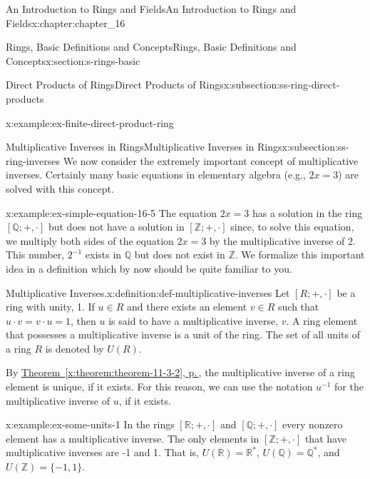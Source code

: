 \documentclass[twoside,10pt,]{book}
\newcommand{\xreffont}{\relax}
\numberwithin{equation}{section}
\begin{document}
\begin{chapterptx}{An Introduction to Rings and Fields}{}{An Introduction to Rings and Fields}{}{}{x:chapter:chapter_16}
\begin{sectionptx}{Rings, Basic Definitions and Concepts}{}{Rings, Basic Definitions and Concepts}{}{}{x:section:s-rings-basic}
\begin{subsectionptx}{Direct Products of Rings}{}{Direct Products of Rings}{}{}{x:subsection:ss-ring-direct-products}
\begin{example}{}{x:example:ex-finite-direct-product-ring}
\end{example}
\end{subsectionptx}
%
%
\typeout{************************************************}
\typeout{************************************************}
%
\begin{subsectionptx}{Multiplicative Inverses in Rings}{}{Multiplicative Inverses in Rings}{}{}{x:subsection:ss-ring-inverses}
We now consider the extremely important concept of multiplicative inverses. Certainly many basic equations in elementary algebra (e.g., \(2x = 3\)) are solved with this concept.%
\begin{example}{}{x:example:ex-simple-equation-16-5}%
The equation \(2x = 3\) has a solution in the ring \([\mathbb{Q}; +, \cdot ]\) but does not have a solution in \([\mathbb{Z}; +, \cdot ]\) since, to solve this equation, we  multiply both sides of the equation \(2x = 3\) by the multiplicative inverse of 2. This number, \(2^{-1}\) exists in \(\mathbb{Q}\) but does not exist in \(\mathbb{Z}\). We formalize this important idea in a definition which by now should be quite familiar to you.%
\end{example}
\begin{definition}{Multiplicative Inverses.}{x:definition:def-multiplicative-inverses}%
%
%
\label{g:notation:idm404591603952}%
Let \([R; +, \cdot ]\) be a ring with unity, 1.  If \(u \in R\) and there exists an element \(v \in  R\) such that \(u\cdot v = v\cdot u = 1\), then \(u\) is said to have a multiplicative inverse, \(v\). A ring element that possesses a multiplicative inverse is a unit of the ring. The set of all units of a ring \(R\) is denoted by \(U(R)\).%
\end{definition}
By \hyperref[x:theorem:theorem-11-3-2]{Theorem~{\xreffont\ref{x:theorem:theorem-11-3-2}}, p.\,\pageref{x:theorem:theorem-11-3-2}}, the multiplicative inverse of a ring element is unique, if it exists.   For this reason, we can use the notation \(u^{-1}\) for the multiplicative inverse of \(u\), if it exists.%
\begin{example}{}{x:example:ex-some-units-1}%
In the rings \([\mathbb{R}; +, \cdot]\) and \([\mathbb{Q}; +, \cdot]\) every nonzero element has a multiplicative inverse. The only elements in \([\mathbb{Z}; +, \cdot]\) that have multiplicative inverses are -1 and 1. That is, \(U(\mathbb{R}) = \mathbb{R}^*\), \(U(\mathbb{Q}) = \mathbb{Q}^*\), and \(U(\mathbb{Z}) = \{-1, 1\}\).%
\end{example}

\end{subsectionptx}
\end{sectionptx}
\end{chapterptx}
\end{document}
